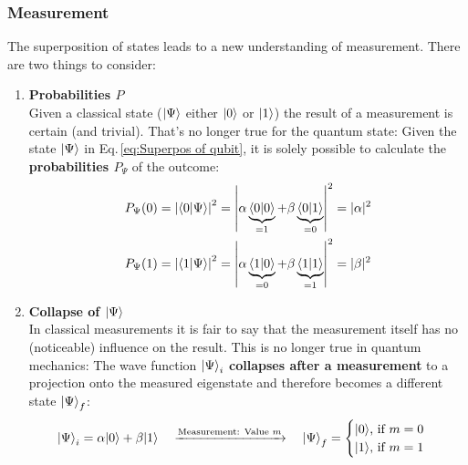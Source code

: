 \documentclass[bibliography=totocnumbered, 10pt]{article}
\theoremstyle{NoticeStyle}
\begin{document}
\subsubsection{Measurement}
The superposition of states leads to a new understanding of measurement. There are two things to consider:
\begin{enumerate}
	\item \textbf{Probabilities $P$}\\
	Given a classical state (${\left\vert{\Psi}\right\rangle}$ either ${\left\vert{0}\right\rangle}$ or ${\left\vert{1}\right\rangle}$) the result of a measurement is certain (and trivial). That's no longer true for the quantum state: Given the state ${\left\vert{\Psi}\right\rangle}$ in Eq.\,\ref{eq:Superpos of qubit}, it is solely possible to calculate the \textbf{probabilities $P_\Psi$} of the outcome:
	\begin{align}
		P_\Psi(0) = \left|\braket{0}{\Psi}\right|^2 &= \left|   \alpha \underbrace{\braket{0}{0}}_{=1} + \beta \underbrace{\braket{0}{1}}_{=0}   \right|^2 = |\alpha|^2\\
		P_\Psi(1) = \left|\braket{1}{\Psi}\right|^2 &= \left|   \alpha \underbrace{\braket{1}{0}}_{=0} + \beta \underbrace{\braket{1}{1}}_{=1}   \right|^2 = |\beta|^2
	\end{align}
	
	\item \textbf{Collapse of ${\left\vert{\Psi}\right\rangle}$}\\
	In classical measurements it is fair to say that the measurement itself has no (noticeable) influence on the result. This is no longer true in quantum mechanics: The wave function ${\left\vert{\Psi}\right\rangle}_i$ \textbf{collapses after a measurement} to a projection onto the measured eigenstate and therefore becomes a different state ${\left\vert{\Psi}\right\rangle}_f$:
	\begin{align}
		{\left\vert{\Psi}\right\rangle}_i = \alpha {\left\vert{0}\right\rangle} + \beta {\left\vert{1}\right\rangle}
		\quad
		\xrightarrow{\text{Measurement:  Value } m}
		\quad
		{\left\vert{\Psi}\right\rangle}_f=
		\begin{cases}
			{\left\vert{0}\right\rangle} \text{,  if } m=0\\
			{\left\vert{1}\right\rangle} \text{,  if } m=1
		\end{cases}
	\end{align}

\end{enumerate}
\end{document}

